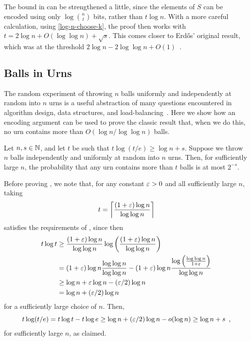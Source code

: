 \documentclass{patmorin}
\begin{document}
\begin{rem}
  The bound in  can be strengthened a little,
  since the elements of $S$ can be encoded using only
  $\log\binom{n}{t}$ bits, rather than $t\log n$.  With a more careful
  calculation, using \eqref{log-n-choose-k}, the proof then works with
  $t = 2\log n +O(\log\log n) + \sqrt{s}$. This comes closer to Erdős'
  original result, which was at the threshold $2\log n - 2\log\log n +
  O(1)$~\cite{erdos:some}.
\end{rem}


\subsection{Balls in Urns}

The random experiment of  throwing $n$ balls uniformly and
independently at random into $n$ urns is a useful abstraction of many
questions encountered in algorithm design, data structures, and 
load-balancing~\cite{mitzenmacher.upfal:probability,motwani.raghavan:randomized}.  Here we
show how an encoding argument can be used to prove the classic result
that, when we do this, no urn contains more than $O(\log n/\log\log
n)$ balls.

\begin{thm}
  Let $n, s \in \mathbb{N}$, and let $t$ be such that $t\log(t/e) \ge \log n + s$.
  Suppose we
  throw $n$ balls independently and uniformly at random into $n$
  urns. Then, for sufficiently large $n$, the probability that any urn
  contains more than $t$ balls is at most $2^{-s}$.
\end{thm}

Before proving , we note that, for any constant $\varepsilon >0$
and all sufficiently large $n$, taking
\[
  t = {\left\lceil \frac{(1+\varepsilon)\log n}{\log\log n} \right\rceil}
\] 
satisfies the requirements of ,  since then
\begin{align*}
  t \log t &\ge \frac{(1 + \varepsilon) \log n}{\log \log n} \log \left( \frac{(1 + \varepsilon) \log n}{\log \log n}\right) \\
  &= (1 + \varepsilon) \log n \frac{\log \log n}{\log \log n} - (1 + \varepsilon) \log n \frac{\log \left(\frac{\log \log n}{1 + \varepsilon}\right)}{\log \log n} \\
  &\geq \log n + \varepsilon \log n - (\varepsilon/2) \log n \\
  &= \log n + (\varepsilon/2) \log n
\end{align*}
for 
a sufficiently large choice of $n$. Then,
\[
  t \log (t/e) = t \log t - t \log e \ge \log n + (\varepsilon/2) \log n 
  - o(\log n) \ge \log n + s \enspace ,
\]
for sufficiently large $n$, as claimed.
\end{document}
